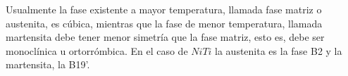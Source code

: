 \documentclass[11pt]{beamer}
\begin{document}
		\begin{frame}
			Usualmente la fase existente a mayor temperatura, llamada fase matriz o austenita, es cúbica, mientras que la fase de menor temperatura, llamada martensita debe tener menor simetría que la fase matriz, esto es, debe ser monoclínica u ortorrómbica. En el caso de $NiTi$ la austenita es la fase B2 y la martensita, la B19'.
			\begin{figure}[H]
			\captionsetup[subfloat]{labelformat=empty}
			\end{figure}
		\end{frame}
\end{document}
